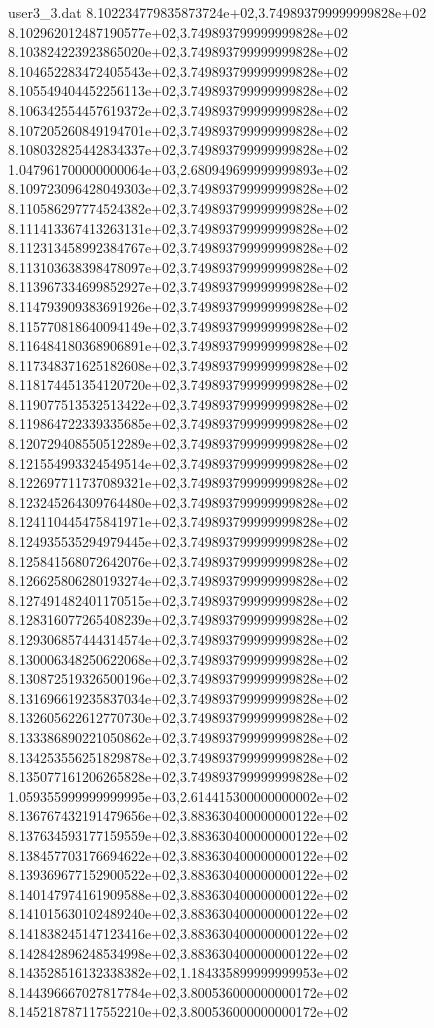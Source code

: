 \begin{filecontents}{user3_3.dat}
8.102234779835873724e+02,3.749893799999999828e+02
8.102962012487190577e+02,3.749893799999999828e+02
8.103824223923865020e+02,3.749893799999999828e+02
8.104652283472405543e+02,3.749893799999999828e+02
8.105549404452256113e+02,3.749893799999999828e+02
8.106342554457619372e+02,3.749893799999999828e+02
8.107205260849194701e+02,3.749893799999999828e+02
8.108032825442834337e+02,3.749893799999999828e+02
1.047961700000000064e+03,2.680949699999999893e+02
8.109723096428049303e+02,3.749893799999999828e+02
8.110586297774524382e+02,3.749893799999999828e+02
8.111413367413263131e+02,3.749893799999999828e+02
8.112313458992384767e+02,3.749893799999999828e+02
8.113103638398478097e+02,3.749893799999999828e+02
8.113967334699852927e+02,3.749893799999999828e+02
8.114793909383691926e+02,3.749893799999999828e+02
8.115770818640094149e+02,3.749893799999999828e+02
8.116484180368906891e+02,3.749893799999999828e+02
8.117348371625182608e+02,3.749893799999999828e+02
8.118174451354120720e+02,3.749893799999999828e+02
8.119077513532513422e+02,3.749893799999999828e+02
8.119864722339335685e+02,3.749893799999999828e+02
8.120729408550512289e+02,3.749893799999999828e+02
8.121554993324549514e+02,3.749893799999999828e+02
8.122697711737089321e+02,3.749893799999999828e+02
8.123245264309764480e+02,3.749893799999999828e+02
8.124110445475841971e+02,3.749893799999999828e+02
8.124935535294979445e+02,3.749893799999999828e+02
8.125841568072642076e+02,3.749893799999999828e+02
8.126625806280193274e+02,3.749893799999999828e+02
8.127491482401170515e+02,3.749893799999999828e+02
8.128316077265408239e+02,3.749893799999999828e+02
8.129306857444314574e+02,3.749893799999999828e+02
8.130006348250622068e+02,3.749893799999999828e+02
8.130872519326500196e+02,3.749893799999999828e+02
8.131696619235837034e+02,3.749893799999999828e+02
8.132605622612770730e+02,3.749893799999999828e+02
8.133386890221050862e+02,3.749893799999999828e+02
8.134253556251829878e+02,3.749893799999999828e+02
8.135077161206265828e+02,3.749893799999999828e+02
1.059355999999999995e+03,2.614415300000000002e+02
8.136767432191479656e+02,3.883630400000000122e+02
8.137634593177159559e+02,3.883630400000000122e+02
8.138457703176694622e+02,3.883630400000000122e+02
8.139369677152900522e+02,3.883630400000000122e+02
8.140147974161909588e+02,3.883630400000000122e+02
8.141015630102489240e+02,3.883630400000000122e+02
8.141838245147123416e+02,3.883630400000000122e+02
8.142842896248534998e+02,3.883630400000000122e+02
8.143528516132338382e+02,1.184335899999999953e+02
8.144396667027817784e+02,3.800536000000000172e+02
8.145218787117552210e+02,3.800536000000000172e+02

\end{filecontents}
